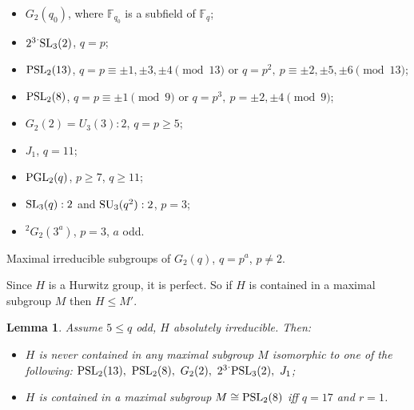 \documentclass{amsart}
\newtheorem{lemma}{Lemma}[section]
\theoremstyle{remark}
\begin{document}
\begin{table}[!h]
\begin{itemize}
\item $G_2(q_0)$, where ${\mathbb{F}}_{q_0}$ is a subfield of ${\mathbb{F}}_q$;
\item ${2^ 3}^.{\mathop{\rm SL}\nolimits}_3(2)$,  $q=p$; 
\item ${\mathop{\rm PSL}\nolimits}_2(13)$, $q=p\equiv \pm 1,\pm 3,\pm 4\pmod{13}$ or $q=p^ 2,\ p\equiv \pm 2, \pm 5,\pm 6\pmod{13}$;
\item ${\mathop{\rm PSL}\nolimits}_2(8)$, $q=p\equiv \pm 1\pmod 9$ or $q=p^ 3,\ p= \pm 2,\pm 4\pmod{9}$;
\item  $G_2(2)= U_3(3):2$,  $q=p\ge 5$;
\item $J_1$, $q=11$;
\item ${\mathop{\rm PGL}\nolimits}_2(q)$, $p\ge 7$, $q\ge 11$; 
\item ${\mathop{\rm SL}\nolimits}_3(q):2$ and ${\mathop{\rm SU}\nolimits}_3(q^2):2$, $p=3$; 
\item $^2G_2(3^a)$, $p=3$, $a$ odd.
\end{itemize}
\caption{ Maximal irreducible subgroups of $G_2(q)$, $q=p^a$, $p\ne 2$.} \label{list}
\end{table}

Since $H$ is a Hurwitz group, it is perfect. So if $H$ is contained in a
maximal subgroup $M$ then $H\le M'$.

\begin{lemma}\label{vari}
Assume $5\le q$ odd, $H$ absolutely irreducible. Then:
\begin{itemize} 
\item[(\rm{i})] $H$ is never contained in any maximal subgroup $M$ isomorphic to one of the following:\enskip
${\mathop{\rm PSL}\nolimits}_2(13),\ {\mathop{\rm PSL}\nolimits}_2(8),\ G_2(2),\ {2^3}^.{\mathop{\rm PSL}\nolimits}_3(2),\ J_1$;
\item[(\rm{ii})] $H$ is contained in a maximal subgroup $M\cong {\mathop{\rm PSL}\nolimits}_2(8)$ iff $q=17$ and $r=1$.
\end{itemize}
\end{lemma}
\end{document}
